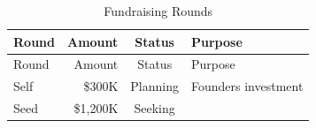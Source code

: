 \documentclass[10pt,openany]{book}
\begin{document}
\begin{longtable}[]{@{}lrcl@{}}
\caption{Fundraising Rounds}\tabularnewline
\toprule
\begin{minipage}[b]{0.13\columnwidth}\raggedright
Round\strut
\end{minipage} & \begin{minipage}[b]{0.10\columnwidth}\raggedleft
Amount\strut
\end{minipage} & \begin{minipage}[b]{0.10\columnwidth}\centering
Status\strut
\end{minipage} & \begin{minipage}[b]{0.55\columnwidth}\raggedright
Purpose\strut
\end{minipage}\tabularnewline
\midrule
\endfirsthead
\toprule
\begin{minipage}[b]{0.13\columnwidth}\raggedright
Round\strut
\end{minipage} & \begin{minipage}[b]{0.10\columnwidth}\raggedleft
Amount\strut
\end{minipage} & \begin{minipage}[b]{0.10\columnwidth}\centering
Status\strut
\end{minipage} & \begin{minipage}[b]{0.55\columnwidth}\raggedright
Purpose\strut
\end{minipage}\tabularnewline
\midrule
\endhead
\begin{minipage}[t]{0.13\columnwidth}\raggedright
Self\strut
\end{minipage} & \begin{minipage}[t]{0.10\columnwidth}\raggedleft
\$300K\strut
\end{minipage} & \begin{minipage}[t]{0.10\columnwidth}\centering
Planning\strut
\end{minipage} & \begin{minipage}[t]{0.55\columnwidth}\raggedright
Founders investment\strut
\end{minipage}\tabularnewline
\begin{minipage}[t]{0.13\columnwidth}\raggedright
Seed\strut
\end{minipage} & \begin{minipage}[t]{0.10\columnwidth}\raggedleft
\$1,200K\strut
\end{minipage} & \begin{minipage}[t]{0.10\columnwidth}\centering
Seeking\strut
\end{minipage} & \begin{minipage}[t]{0.55\columnwidth}\raggedright

\end{minipage}
\end{longtable}
\end{document}
